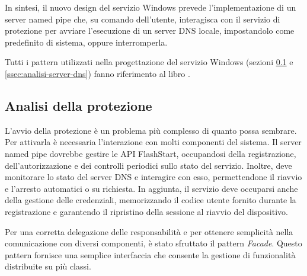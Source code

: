 \documentclass[12pt,a4paper,openright,twoside]{book}
\begin{document}
In sintesi, il nuovo design del servizio Windows prevede l'implementazione di un server named pipe che, su comando dell'utente, interagisca con il servizio di protezione per avviare l'esecuzione di un server \gls{DNS} locale, impostandolo come predefinito di sistema, oppure interromperla.

Tutti i pattern utilizzati nella progettazione del servizio Windows (sezioni \ref{ssec:analisi-protezione} e \ref{ssec:analisi-server-dns}) fanno riferimento al libro \cite{GoF94}.

\subsection{Analisi della protezione}
\label{ssec:analisi-protezione}

L'avvio della protezione è un problema più complesso di quanto possa sembrare.
Per attivarla è necessaria l'interazione con molti componenti del sistema.
Il server named pipe dovrebbe gestire le API FlashStart, occupandosi della registrazione, dell'autorizzazione e dei controlli periodici sullo stato del servizio.
Inoltre, deve monitorare lo stato del server \gls{DNS} e interagire con esso, permettendone il riavvio e l'arresto automatici o su richiesta. 
In aggiunta, il servizio deve occuparsi anche della gestione delle credenziali, memorizzando il codice utente fornito durante la registrazione e garantendo il ripristino della sessione al riavvio del dispositivo.

Per una corretta delegazione delle responsabilità e per ottenere semplicità nella comunicazione con diversi componenti, è stato sfruttato il pattern \textit{Facade}.
Questo pattern fornisce una semplice interfaccia che consente la gestione di funzionalità distribuite su più classi.
\end{document}
